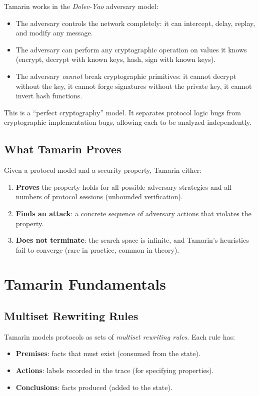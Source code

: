 \documentclass[11pt,a4paper]{article}
\begin{document}
Tamarin works in the \emph{Dolev-Yao} adversary model:
\begin{itemize}[nosep]
  \item The adversary controls the network completely: it can intercept, delay, replay,
    and modify any message.
  \item The adversary can perform any cryptographic operation on values it knows (encrypt,
    decrypt with known keys, hash, sign with known keys).
  \item The adversary \emph{cannot} break cryptographic primitives: it cannot decrypt
    without the key, it cannot forge signatures without the private key, it cannot
    invert hash functions.
\end{itemize}

This is a ``perfect cryptography'' model. It separates protocol logic bugs from
cryptographic implementation bugs, allowing each to be analyzed independently.

\subsection{What Tamarin Proves}

Given a protocol model and a security property, Tamarin either:
\begin{enumerate}[nosep]
  \item \textbf{Proves} the property holds for all possible adversary strategies and all
    numbers of protocol sessions (unbounded verification).
  \item \textbf{Finds an attack}: a concrete sequence of adversary actions that violates
    the property.
  \item \textbf{Does not terminate}: the search space is infinite, and Tamarin's heuristics
    fail to converge (rare in practice, common in theory).
\end{enumerate}

\section{Tamarin Fundamentals}

\subsection{Multiset Rewriting Rules}

Tamarin models protocols as sets of \emph{multiset rewriting rules}. Each rule has:
\begin{itemize}[nosep]
  \item \textbf{Premises}: facts that must exist (consumed from the state).
  \item \textbf{Actions}: labels recorded in the trace (for specifying properties).
  \item \textbf{Conclusions}: facts produced (added to the state).
\end{itemize}
\end{document}
